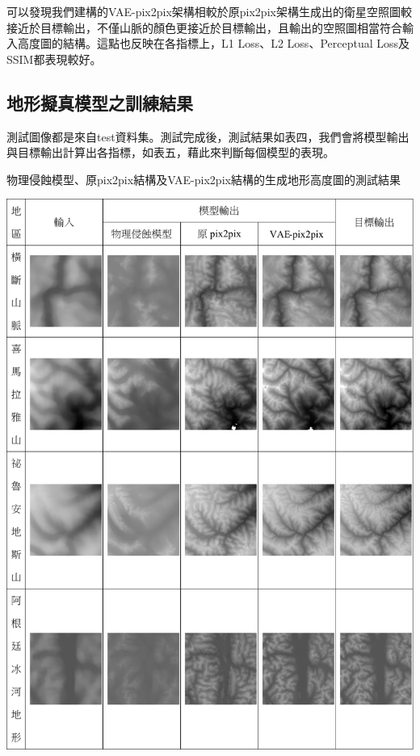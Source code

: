\documentclass[a4paper, 12pt]{article}
\begin{document}
可以發現我們建構的VAE-pix2pix架構相較於原pix2pix架構生成出的衛星空照圖較接近於目標輸出，不僅山脈的顏色更接近於目標輸出，且輸出的空照圖相當符合輸入高度圖的結構。這點也反映在各指標上，L1 Loss、L2 Loss、Perceptual Loss及SSIM都表現較好。

\subsection{地形擬真模型之訓練結果}

測試圖像都是來自test資料集。測試完成後，測試結果如表四，我們會將模型輸出與目標輸出計算出各指標，如表五，藉此來判斷每個模型的表現。

\begin{table}[H]
    \centering
    \caption{物理侵蝕模型、原pix2pix結構及VAE-pix2pix結構的生成地形高度圖的測試結果}
    \label{tab:4}
    \includegraphics[width=0.9\linewidth]{fig/tab4.jpg}
\end{table}
\end{document}
